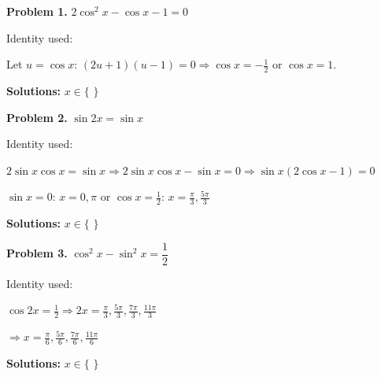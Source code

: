 \documentclass[10pt]{article}
\begin{document}
\vspace{0.08in}

\begin{tcolorbox}[colback=white, colframe=black!40,
    title=\textbf{Tier A --- Apply (Key)},
    fonttitle=\bfseries, arc=2mm, left=3mm, right=3mm, top=2mm, bottom=2mm]

\textbf{Problem 1.} $2\cos^2 x - \cos x - 1 = 0$

Identity used: 

Let $u = \cos x$: $(2u + 1)(u - 1) = 0 \Rightarrow \cos x = -\tfrac{1}{2}$ or $\cos x = 1$.

\textbf{Solutions:} $x \in \big\{$  $\big\}$

\vspace{8pt}
\textbf{Problem 2.} $\sin 2x = \sin x$

Identity used: 

$2\sin x\cos x = \sin x \Rightarrow 2\sin x\cos x - \sin x = 0 \Rightarrow \sin x(2\cos x - 1) = 0$

$\sin x = 0$: $x = 0, \pi$ \quad or \quad $\cos x = \tfrac{1}{2}$: $x = \tfrac{\pi}{3}, \tfrac{5\pi}{3}$

\textbf{Solutions:} $x \in \big\{$  $\big\}$

\vspace{8pt}
\textbf{Problem 3.} $\cos^2 x - \sin^2 x = \dfrac{1}{2}$

Identity used: 

$\cos 2x = \tfrac{1}{2} \Rightarrow 2x = \tfrac{\pi}{3}, \tfrac{5\pi}{3}, \tfrac{7\pi}{3}, \tfrac{11\pi}{3}$

$\Rightarrow x = \tfrac{\pi}{6}, \tfrac{5\pi}{6}, \tfrac{7\pi}{6}, \tfrac{11\pi}{6}$

\textbf{Solutions:} $x \in \big\{$  $\big\}$

\end{tcolorbox}

\vspace{0.08in}
\end{document}
